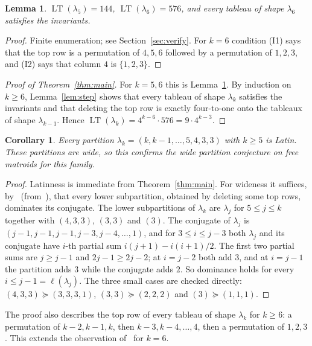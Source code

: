 \documentclass[11pt]{amsart}
\newtheorem{lemma}[theorem]{Lemma}
\newtheorem{corollary}[theorem]{Corollary}
\theoremstyle{definition}
\theoremstyle{remark}
\newcommand{\LT}{\operatorname{LT}}
\begin{document}
\begin{lemma}\label{lem:base}
$\LT(\lambda_5)=144$, $\LT(\lambda_6)=576$, and every tableau of shape $\lambda_6$ satisfies the invariants.
\end{lemma}

\begin{proof}
Finite enumeration; see Section~\ref{sec:verify}. For $k=6$ condition (I1) says that the top row is a permutation of $4,5,6$ followed by a permutation of $1,2,3$, and (I2) says that column $4$ is $\{1,2,3\}$.
\end{proof}

\begin{proof}[Proof of Theorem~\ref{thm:main}]
For $k=5,6$ this is Lemma~\ref{lem:base}. By induction on $k\ge6$, Lemma~\ref{lem:step} shows that every tableau of shape $\lambda_k$ satisfies the invariants and that deleting the top row is exactly four-to-one onto the tableaux of shape $\lambda_{k-1}$. Hence $\LT(\lambda_k)=4^{k-6}\cdot576=9\cdot4^{k-3}$.
\end{proof}

\begin{corollary}
Every partition $\lambda_k=(k,k-1,\dots,5,4,3,3)$ with $k\ge5$ is Latin. These partitions are wide, so this confirms the wide partition conjecture on free matroids for this family.
\end{corollary}

\begin{proof}
Latinness is immediate from Theorem~\ref{thm:main}. For wideness it suffices, by~\cite[Proposition~2.4]{DFHLMP2026} (from~\cite{CFGV2003}), that every lower subpartition, obtained by deleting some top rows, dominates its conjugate. The lower subpartitions of $\lambda_k$ are $\lambda_j$ for $5\le j\le k$ together with $(4,3,3)$, $(3,3)$ and $(3)$. The conjugate of $\lambda_j$ is $(j-1,j-1,j-1,j-3,j-4,\dots,1)$, and for $3\le i\le j-3$ both $\lambda_j$ and its conjugate have $i$-th partial sum $i(j+1)-i(i+1)/2$. The first two partial sums are $j\ge j-1$ and $2j-1\ge2j-2$; at $i=j-2$ both add $3$, and at $i=j-1$ the partition adds $3$ while the conjugate adds $2$. So dominance holds for every $i\le j-1=\ell(\lambda_j)$. The three small cases are checked directly: $(4,3,3)\succeq(3,3,3,1)$, $(3,3)\succeq(2,2,2)$ and $(3)\succeq(1,1,1)$.
\end{proof}

The proof also describes the top row of every tableau of shape $\lambda_k$ for $k\ge6$: a permutation of $k-2,k-1,k$, then $k-3,k-4,\dots,4$, then a permutation of $1,2,3$. This extends the observation of~\cite[\S6]{DFHLMP2026} for $k=6$.
\end{document}
